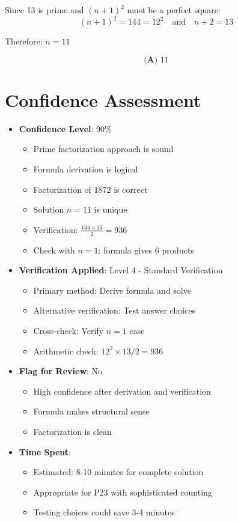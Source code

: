\documentclass[12pt]{article}
\begin{document}
Since 13 is prime and $(n+1)^2$ must be a perfect square:
$$(n+1)^2 = 144 = 12^2 \quad \text{and} \quad n+2 = 13$$

Therefore: $n = 11$

$$\boxed{\textbf{(A) } 11}$$

\section*{Confidence Assessment}
\begin{itemize}[leftmargin=*]
    \item \textbf{Confidence Level}: 90\% 
    \begin{itemize}
        \item Prime factorization approach is sound
        \item Formula derivation is logical
        \item Factorization of 1872 is correct
        \item Solution $n=11$ is unique
        \item Verification: $\frac{144 \times 13}{2} = 936$ \checkmark
        \item Check with $n=1$: formula gives 6 products \checkmark
    \end{itemize}
    \item \textbf{Verification Applied}: Level 4 - Standard Verification
    \begin{itemize}
        \item Primary method: Derive formula and solve
        \item Alternative verification: Test answer choices
        \item Cross-check: Verify $n=1$ case
        \item Arithmetic check: $12^2 \times 13 / 2 = 936$
    \end{itemize}
    \item \textbf{Flag for Review}: No
    \begin{itemize}
        \item High confidence after derivation and verification
        \item Formula makes structural sense
        \item Factorization is clean
    \end{itemize}
    \item \textbf{Time Spent}: 
    \begin{itemize}
        \item Estimated: 8-10 minutes for complete solution
        \item Appropriate for P23 with sophisticated counting
        \item Testing choices could save 3-4 minutes
    \end{itemize}
\end{itemize}
\end{document}
